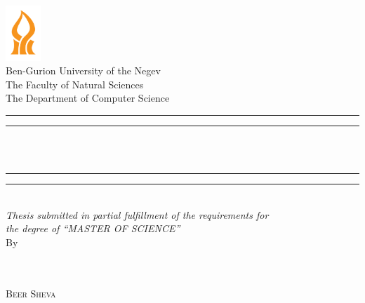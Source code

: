 \begin{center}
\includegraphics[width=0.1\textwidth]{01Cover/Images/bgu.png}\\
\vspace{9mm}
{\large Ben-Gurion University of the Negev\\
The Faculty of Natural Sciences\\
The Department of Computer Science}\\
\vspace{2mm}
\rule[0.5ex]{\linewidth}{2pt}\vspace*{-\baselineskip}\vspace*{3.2pt}
\rule[0.5ex]{\linewidth}{1pt}\\
[\baselineskip]{\Huge \thesisTitle}\\[3mm]
\rule[0.5ex]{\linewidth}{1pt}\vspace*{-\baselineskip}\vspace{3.2pt}
\rule[0.5ex]{\linewidth}{2pt}\\
[9mm]
{\large \textit{Thesis submitted in partial fulfillment of the requirements for\\ [2mm]
    the degree of \enquote{MASTER OF SCIENCE}
}}\\ [2mm]
\vspace{8mm}
{\large By}\\
\vspace{2.5mm}
{\large\textsc{\thesisAuthor}}\\
\vspace{10mm}

\vspace{5em}
{\large\textsc{}}\\
\vspace{2em}
{\large\textsc{Beer Sheva}}
\end{center}
\thispagestyle{empty} %
\cleardoubleoddemptypage

